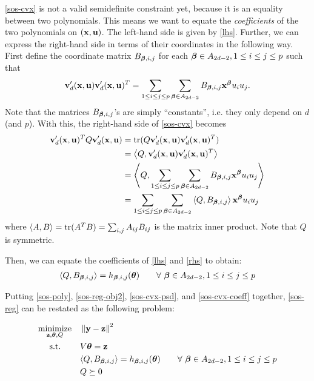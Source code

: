 \documentclass[11pt]{article}
\begin{document}
\eqref{sos-cvx} is not a valid semidefinite constraint yet, because it is an equality between two polynomials. This means we want to equate the \emph{coefficients} of the two polynomials on $({\bf x}, {\bf u})$. The left-hand side is given by \eqref{lhs}. Further, we can express the right-hand side in terms of their coordinates in the following way. First define the coordinate matrix $B_{{\boldsymbol\beta}, i, j}$ for each ${\boldsymbol\beta} \in A_{2d - 2}, 1 \le i \le j \le p$ such that
\[
{\bf v}_d'({\bf x}, {\bf u}) {\bf v}_d'({\bf x}, {\bf u})^T = \sum_{1 \le i \le j \le p}  \sum_{{\boldsymbol\beta} \in A_{2d - 2}} B_{{\boldsymbol\beta}, i, j} {\bf x}^{{\boldsymbol\beta}}  u_iu_j.
\]
Note that the matrices $B_{{\boldsymbol\beta}, i, j}$'s are simply ``constants'', i.e. they only depend on $d$ (and $p$). With this, the right-hand side of \eqref{sos-cvx} becomes
\begin{align}\label{rhs}
{\bf v}_d'({\bf x},{\bf u})^T Q {\bf v}_d'({\bf x},{\bf u}) &= \operatorname{tr}(Q {\bf v}_d'({\bf x}, {\bf u}) {\bf v}_d'({\bf x}, {\bf u})^T) \notag\\
&= \left\langle Q, {\bf v}_d'({\bf x}, {\bf u}) {\bf v}_d'({\bf x}, {\bf u})^T \right\rangle \notag\\
&= \left\langle Q, \sum_{1 \le i \le j \le p} \sum_{{\boldsymbol\beta} \in A_{2d - 2}} B_{{\boldsymbol\beta}, i, j} {\bf x}^{{\boldsymbol\beta}}  u_iu_j \right\rangle \notag\\
&= \sum_{1 \le i \le j \le p} \sum_{{\boldsymbol\beta} \in A_{2d - 2}} \left\langle Q, B_{{\boldsymbol\beta}, i, j} \right\rangle {\bf x}^{{\boldsymbol\beta}}  u_iu_j
\end{align}
where $\left\langle A,B \right\rangle = \operatorname{tr}(A^TB) = \sum_{i,j} A_{ij}B_{ij}$ is the  matrix inner product. Note that $Q$ is symmetric.

Then, we can equate the coefficients of \eqref{lhs} and \eqref{rhs} to obtain:
\begin{align}
\left\langle Q, B_{{\boldsymbol\beta}, i, j} \right\rangle = h_{{\boldsymbol\beta}, i, j}({\boldsymbol\theta}) \qquad \forall\ {\boldsymbol\beta} \in A_{2d - 2}, 1 \le i \le j \le p \label{sos-cvx-coeff}
\end{align}

Putting \eqref{sos-poly}, \eqref{sos-reg-obj2}, \eqref{sos-cvx-psd}, and \eqref{sos-cvx-coeff} together, \eqref{sos-reg} can be restated as the following problem:

\begin{equation}\label{sos-reg2}
\begin{aligned}
& \underset{{\bf z}, {\boldsymbol\theta}, Q}{\text{minimize}}
& & \left\lVert {\bf y}-{\bf z} \right\rVert^2 \\
& \text{\quad\ s.t.}
& &  V{\boldsymbol\theta} = {\bf z} \\
& & & \langle{Q, B_{{\boldsymbol\beta}, i, j}} \rangle = h_{{\boldsymbol\beta}, i, j}({\boldsymbol\theta}) \qquad \forall\ {\boldsymbol\beta} \in A_{2d - 2}, 1 \le i \le j \le p \\
& & & Q \succeq 0 
\end{aligned}
\end{equation}
\end{document}
